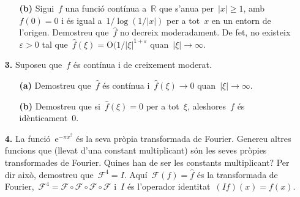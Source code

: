 \documentclass[a4paper]{article}
\theoremstyle{definition}
\newcommand{\e}{\mathrm{e}}
\newcommand{\uppi}{\pi}
\newcommand{\abs}[1]{\lvert{#1}\rvert}
\newcommand{\F}{\mathcal{F}}
\begin{document}
\begin{enumerate}
    \item[]\begin{enumerate}
        \item[\textbf{(b)}] Sigui~\(f\) una funció contínua a~\(\mathbb{R}\) que
            s'anu{\lgem}a per~\(\abs{x}\geq1\), amb~\(f(0)=0\) i és igual
            a~\(1/\log(1/\abs{x})\) per a tot~\(x\) en un entorn de l'origen.
            Demostreu que~\(\widehat{f}\) no decreix moderadament.
            De fet, no existeix~\(\varepsilon>0\) tal que~\(\widehat{f}(\xi) =
            \textrm{O}(1/\abs{\xi}^{1+\varepsilon}\)
            quan~\(\abs{\xi}\to\infty\).
    \end{enumerate}
\end{enumerate}

\begin{enumerate}
    \item[\textbf{3.}] Suposeu que~\(f\) és contínua i de creixement moderat.
        \begin{enumerate}
            \item[\textbf{(a)}] Demostreu que~\(\widehat{f}\) és contínua
                i~\(\widehat{f}(\xi)\to0\) quan~\(\abs{\xi}\to\infty\).
        \end{enumerate}
\end{enumerate}

\begin{enumerate}
    \item[]\begin{enumerate}
        \item[\textbf{(b)}] Demostreu que si~\(\widehat{f}(\xi) = 0\) per a
            tot~\(\xi\), aleshores~\(f\) és idènticament~\(0\).
    \end{enumerate}
\end{enumerate}

\begin{enumerate}
    \item[\textbf{4.}] La funció~\(\e^{-\uppi x^{2}}\) és la seva pròpia
        transformada de Fourier.
        Genereu altres funcions que (llevat d'una constant multiplicant) són les
        seves pròpies transformades de Fourier.
        Quines han de ser les constants multiplicant?
        Per dir això, demostreu que~\(\F^{4} = I\).
        Aquí~\(\F(f) = \widehat{f}\) és la transformada de Fourier,~\(\F^{4} =
        \F\circ\F\circ\F\circ\F\) i~\(I\) és l'operador identitat~\((If)(x) =
        f(x)\).
\end{enumerate}
\end{document}
